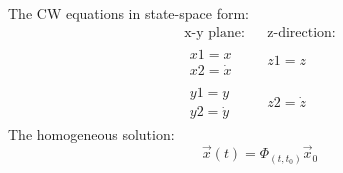 \documentclass[11pt, a4paper]{article}
\begin{document}
The CW equations in state-space form:
\begin{equation}
    \begin{matrix}
        \text{x-y plane:} && \text{z-direction:} \\
        \begin{matrix}
            x1 = x \\
            x2 = \dot{x}
        \end{matrix} && z1 = z \\
        \begin{matrix}
            y1 = y \\
            y2 = \dot{y}
        \end{matrix} && z2 = \dot{z}
    \end{matrix}
\end{equation}
The homogeneous solution:
\begin{equation}
    \vec{x}(t) = \Phi_{(t,t_0)}\vec{x}_0
\end{equation}
\end{document}
